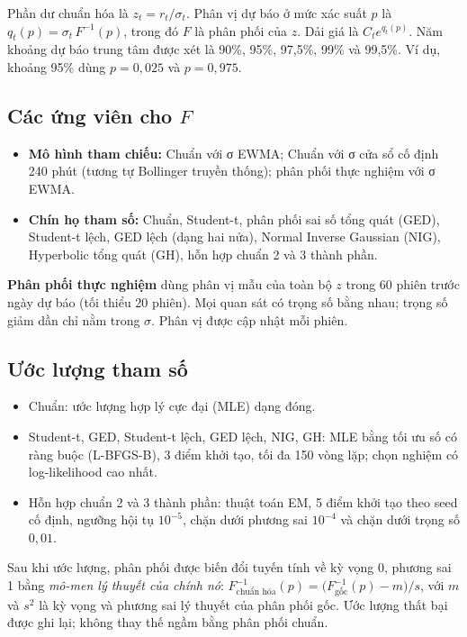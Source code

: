 \documentclass[11pt,a4paper]{article}
\begin{document}
Phần dư chuẩn hóa là $z_t = r_t/\sigma_t$. Phân vị dự báo ở mức xác suất $p$ là $q_t(p) = \sigma_t\,F^{-1}(p)$, trong đó $F$ là phân phối của $z$. Dải giá là $C_t e^{q_t(p)}$. Năm khoảng dự báo trung tâm được xét là 90\%, 95\%, 97,5\%, 99\% và 99,5\%. Ví dụ, khoảng 95\% dùng $p=0{,}025$ và $p=0{,}975$.

\subsection{\texorpdfstring{Các ứng viên cho $F$}{Các ứng viên cho F}}

\begin{itemize}[nosep]
\item \textbf{Mô hình tham chiếu:} Chuẩn với σ EWMA; Chuẩn với σ cửa sổ cố định 240 phút (tương tự Bollinger truyền thống); phân phối thực nghiệm với σ EWMA.
\item \textbf{Chín họ tham số:} Chuẩn, Student-t, phân phối sai số tổng quát (GED), Student-t lệch, GED lệch (dạng hai nửa), Normal Inverse Gaussian (NIG), Hyperbolic tổng quát (GH), hỗn hợp chuẩn 2 và 3 thành phần.
\end{itemize}

\textbf{Phân phối thực nghiệm} dùng phân vị mẫu của toàn bộ $z$ trong 60 phiên trước ngày dự báo (tối thiểu 20 phiên). Mọi quan sát có trọng số bằng nhau; trọng số giảm dần chỉ nằm trong $\sigma$. Phân vị được cập nhật mỗi phiên.

\subsection{Ước lượng tham số}

\begin{itemize}[nosep]
\item Chuẩn: ước lượng hợp lý cực đại (MLE) dạng đóng.
\item Student-t, GED, Student-t lệch, GED lệch, NIG, GH: MLE bằng tối ưu số có ràng buộc (L-BFGS-B), 3 điểm khởi tạo, tối đa 150 vòng lặp; chọn nghiệm có log-likelihood cao nhất.
\item Hỗn hợp chuẩn 2 và 3 thành phần: thuật toán EM, 5 điểm khởi tạo theo seed cố định, ngưỡng hội tụ $10^{-5}$, chặn dưới phương sai $10^{-4}$ và chặn dưới trọng số $0{,}01$.
\end{itemize}

Sau khi ước lượng, phân phối được biến đổi tuyến tính về kỳ vọng 0, phương sai 1 bằng \emph{mô-men lý thuyết của chính nó}: $F^{-1}_{\text{chuẩn hóa}}(p) = \bigl(F^{-1}_{\text{gốc}}(p)-m\bigr)/s$, với $m$ và $s^2$ là kỳ vọng và phương sai lý thuyết của phân phối gốc. Ước lượng thất bại được ghi lại; không thay thế ngầm bằng phân phối chuẩn.
\end{document}
